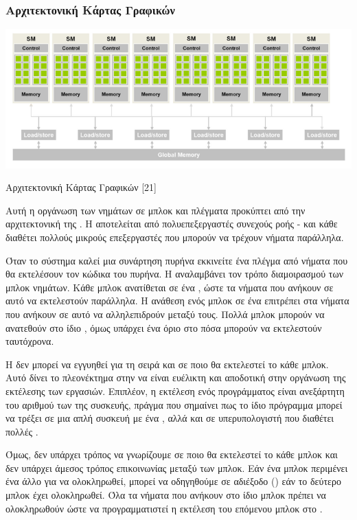 \subsubsection{Αρχιτεκτονική Κάρτας Γραφικών}
 
\begin{Illustration}[!h] 
	\centering
	\includegraphics[width=\textwidth]{images/image050.png} 
	\caption{Αρχιτεκτονική Κάρτας Γραφικών [21]}
	\label{image-3.7}
\end{Illustration}


Αυτή η οργάνωση των νημάτων σε μπλοκ και πλέγματα προκύπτει από την αρχιτεκτονική της . H  αποτελείται από πολυεπεξεργαστές συνεχούς ροής -  και κάθε  διαθέτει πολλούς μικρούς επεξεργαστές που μπορούν να τρέχουν νήματα παράλληλα.

Όταν το σύστημα καλεί μια συνάρτηση πυρήνα εκκινείτε ένα πλέγμα από νήματα που θα εκτελέσουν τον κώδικα του πυρήνα. Η  αναλαμβάνει τον τρόπο διαμοιρασμού των μπλοκ νημάτων. Κάθε μπλοκ ανατίθεται σε ένα , ώστε τα νήματα που ανήκουν σε αυτό να εκτελεστούν παράλληλα. Η ανάθεση ενός μπλοκ σε ένα  επιτρέπει στα νήματα που ανήκουν σε αυτό να αλληλεπιδρούν μεταξύ τους. Πολλά μπλοκ μπορούν να ανατεθούν στο ίδιο , όμως υπάρχει ένα όριο στο πόσα μπορούν να εκτελεστούν ταυτόχρονα.

Η  δεν μπορεί να εγγυηθεί για τη σειρά και σε ποιο  θα εκτελεστεί το κάθε μπλοκ. Αυτό δίνει το πλεονέκτημα στην  να είναι ευέλικτη και αποδοτική στην οργάνωση της εκτέλεσης των εργασιών. Επιπλέον, η εκτέλεση ενός προγράμματος  είναι ανεξάρτητη του αριθμού των  της συσκευής, πράγμα που σημαίνει πως το ίδιο πρόγραμμα μπορεί να τρέξει σε μια απλή συσκευή με ένα , αλλά και σε υπερυπολογιστή που διαθέτει πολλές .

Όμως, δεν υπάρχει τρόπος να γνωρίζουμε σε ποιο  θα εκτελεστεί το κάθε μπλοκ και δεν υπάρχει άμεσος τρόπος επικοινωνίας μεταξύ των μπλοκ. Εάν ένα μπλοκ περιμένει ένα άλλο για να ολοκληρωθεί, μπορεί να οδηγηθούμε σε αδιέξοδο () εάν το δεύτερο μπλοκ έχει ολοκληρωθεί. Όλα τα νήματα που ανήκουν στο ίδιο μπλοκ πρέπει να ολοκληρωθούν ώστε να προγραμματιστεί η εκτέλεση του επόμενου μπλοκ στο .


